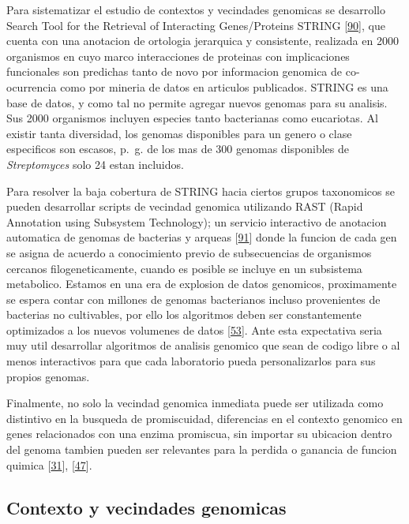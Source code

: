 \documentclass[12pt,twoside]{reedthesis}
\begin{document}
  Para sistematizar el estudio de contextos y vecindades genomicas se
  desarrollo Search Tool for the Retrieval of Interacting Genes/Proteins
  STRING {[}\protect\hyperlink{ref-snel_string_2000}{90}{]}, que cuenta
  con una anotacion de ortologia jerarquica y consistente, realizada en
  2000 organismos en cuyo marco interacciones de proteinas con
  implicaciones funcionales son predichas tanto de novo por informacion
  genomica de co-ocurrencia como por mineria de datos en articulos
  publicados. STRING es una base de datos, y como tal no permite agregar
  nuevos genomas para su analisis. Sus 2000 organismos incluyen especies
  tanto bacterianas como eucariotas. Al existir tanta diversidad, los
  genomas disponibles para un genero o clase especificos son escasos,
  p.~g. de los mas de 300 genomas disponibles de \emph{Streptomyces} solo
  24 estan incluidos.
  
  Para resolver la baja cobertura de STRING hacia ciertos grupos
  taxonomicos se pueden desarrollar scripts de vecindad genomica
  utilizando RAST (Rapid Annotation using Subsystem Technology); un
  servicio interactivo de anotacion automatica de genomas de bacterias y
  arqueas {[}\protect\hyperlink{ref-aziz_rast_2008}{91}{]} donde la
  funcion de cada gen se asigna de acuerdo a conocimiento previo de
  subsecuencias de organismos cercanos filogeneticamente, cuando es
  posible se incluye en un subsistema metabolico. Estamos en una era de
  explosion de datos genomicos, proximamente se espera contar con millones
  de genomas bacterianos incluso provenientes de bacterias no cultivables,
  por ello los algoritmos deben ser constantemente optimizados a los
  nuevos volumenes de datos
  {[}\protect\hyperlink{ref-medema_computational_2015}{53}{]}. Ante esta
  expectativa seria muy util desarrollar algoritmos de analisis genomico
  que sean de codigo libre o al menos interactivos para que cada
  laboratorio pueda personalizarlos para sus propios genomas.
  
  Finalmente, no solo la vecindad genomica inmediata puede ser utilizada
  como distintivo en la busqueda de promiscuidad, diferencias en el
  contexto genomico en genes relacionados con una enzima promiscua, sin
  importar su ubicacion dentro del genoma tambien pueden ser relevantes
  para la perdida o ganancia de funcion quimica
  {[}\protect\hyperlink{ref-noda-garcia_evolution_2013}{31}{]},
  {[}\protect\hyperlink{ref-juarez-vazquez_evolution_2017}{47}{]}.
  
  \subsection{Contexto y vecindades
  genomicas}\label{contexto-y-vecindades-genomicas}
  
\end{document}
